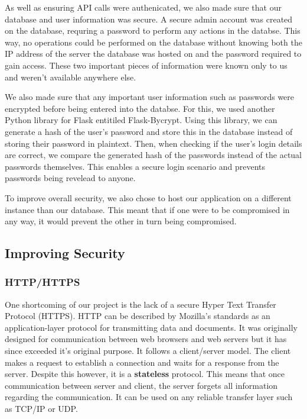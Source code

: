     As well as ensuring API calls were authenicated, we also made sure that our database and user information was secure. A secure admin account was created on the database, requring a password to perform any actions in the databse.
    This way, no operations could be performed on the database without knowing both the IP address of the server the database was hosted on and the password required to gain access. These two important pieces of information were known only to us and 
    weren't available anywhere else. 

    We also made sure that any important user information such as passwords were encrypted before being entered into the databse.
    For this, we used another Python library for Flask entitiled Flask-Bycrypt. Using this library, we can generate a hash of the user's password and store this in the database instead of storing their password in plaintext. Then, when checking if 
    the user's login details are correct, we compare the generated hash of the passwords instead of the actual passwords themselves. This enables a secure login scenario and prevents passwords being revelead to anyone.

    To improve overall security, we also chose to host our application on a different instance than our database. This meant that if one were to be compromised in any way, it would prevent the other in turn being compromised.

    \subsection{Improving Security}
    \subsubsection{HTTP/HTTPS}
    One shortcoming of our project is the lack of a secure Hyper Text Transfer Protocol (HTTPS). HTTP can be described by Mozilla's standards \cite{HTTPviaMozilla} as an application-layer protocol 
    for transmitting data and documents. It was originally designed for communication between web browsers and web servers but it has since exceeded it's original purpose. It follows a client/server model. The client makes a 
    request to establish a connection and waits for a response from the server. Despite this however, it is a \textbf{stateless} protocol. This means that once communication between server and client, the server forgets all information regarding
    the communication. It can be used on any reliable transfer layer such as TCP/IP or UDP.

